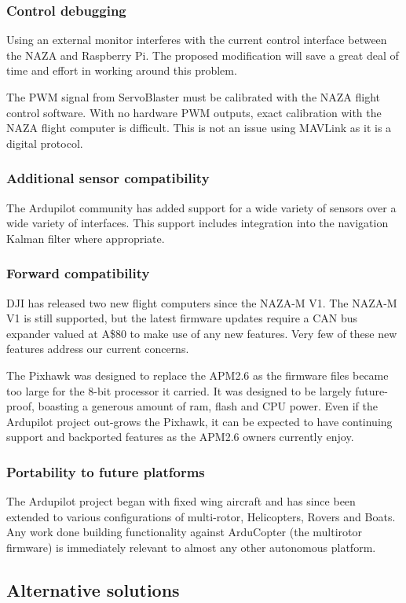 \documentclass[a4paper, 11pt, titlepage]{article}
\begin{document}
\subsubsection{Control debugging}
Using an external monitor interferes with the current control interface between the NAZA and Raspberry Pi. The proposed modification will save a great deal of time and effort in working around this problem.

The PWM signal from ServoBlaster must be calibrated with the  NAZA flight control software. With no hardware PWM outputs, exact calibration with the NAZA flight computer is difficult. This is not an issue using MAVLink as it is a digital protocol. 

\subsubsection{Additional sensor compatibility}
The Ardupilot community has added support for a wide variety of sensors over a wide variety of interfaces. This support includes integration into the navigation Kalman filter where appropriate.
\subsubsection{Forward compatibility}
DJI has released two new flight computers since the NAZA-M V1.
The NAZA-M V1 is still supported, but the latest firmware updates require a CAN bus expander valued at A\$80 to make use of any new features.  Very few of these new features address our current concerns.

The Pixhawk was designed to replace the APM2.6 as the firmware files became too large for the 8-bit processor it carried.  It was designed to be largely future-proof, boasting a generous amount of ram, flash and CPU power.  Even if the Ardupilot project out-grows the Pixhawk, it can be expected to have continuing support and backported features as the APM2.6 owners currently enjoy.
\subsubsection{Portability to future platforms}
The Ardupilot project began with fixed wing aircraft and has since been extended to various configurations of multi-rotor, Helicopters, Rovers and Boats.
Any work done building functionality against ArduCopter (the multirotor firmware) is immediately relevant to almost any other autonomous platform.

\subsection{Alternative solutions}
\end{document}
